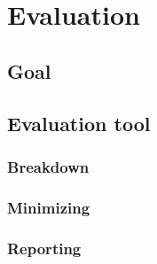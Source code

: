 \chapter{Evaluation}\label{C:eval}
%

\section{Goal}

\section{Evaluation tool}

\subsection{Breakdown}

\subsection{Minimizing}

\subsection{Reporting}


